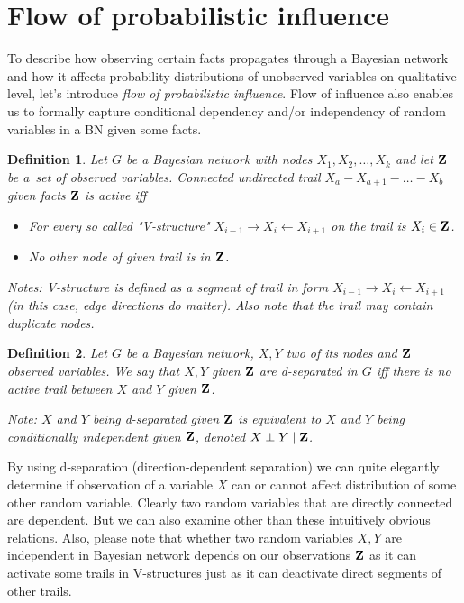 \documentclass[english,cover]{fitthesis} %
\newtheorem{math_def}{Definition}[chapter] %
\newcommand{\term}[1]{\emph{#1}}           %
\newcommand{\vars}[1]{{\bold{#1}}}         %
\begin{document}
\section{Flow of probabilistic influence}
To describe how observing certain facts propagates through a Bayesian network and how it affects probability distributions of unobserved variables on qualitative level, let's introduce \term{flow of probabilistic influence}. Flow of influence also enables us to formally capture conditional dependency and/or independency of random variables in a BN given some facts.
\begin{math_def}
    Let $G$ be a Bayesian network with nodes $X_1, X_2, \dots, X_k$ and let $\vars{Z}$ be a~set of observed variables. Connected undirected trail $X_a - X_{a+1} - \dots - X_b$ given facts $\vars{Z}$ is active iff
    \begin{itemize}
        \item For every so called "V-structure" $X_{i-1} \rightarrow X_i \leftarrow X_{i+1}$ on the trail is $X_i \in \vars{Z}$.
        \item No other node of given trail is in $\vars{Z}$.
    \end{itemize}
    Notes: V-structure is defined as a segment of trail in form $X_{i-1} \rightarrow X_i \leftarrow X_{i+1}$ (in this case, edge directions do matter). Also note that the trail may contain duplicate nodes.
\end{math_def}

\begin{math_def}
    Let $G$ be a Bayesian network, $X,Y$ two of its nodes and $\vars{Z}$ observed variables. We say that $X,Y$ given $\vars{Z}$ are d-separated in $G$ iff there is no active trail between $X$ and $Y$ given $\vars{Z}$.
    
    Note: $X$ and $Y$ being d-separated given $\vars{Z}$ is equivalent to $X$ and $Y$ being conditionally independent given $\vars{Z}$, denoted $X \perp Y \mid \vars{Z}$.
\end{math_def}

By using d-separation (direction-dependent separation) we can quite elegantly determine if observation of a variable $X$ can or cannot affect distribution of some other random variable. Clearly two random variables that are directly connected are dependent. But we can also examine other than these intuitively obvious relations. Also, please note that whether two random variables $X,Y$ are independent in Bayesian network depends on our observations $\vars{Z}$ as it can activate some trails in V-structures just as it can deactivate direct segments of other trails.
\end{document}
